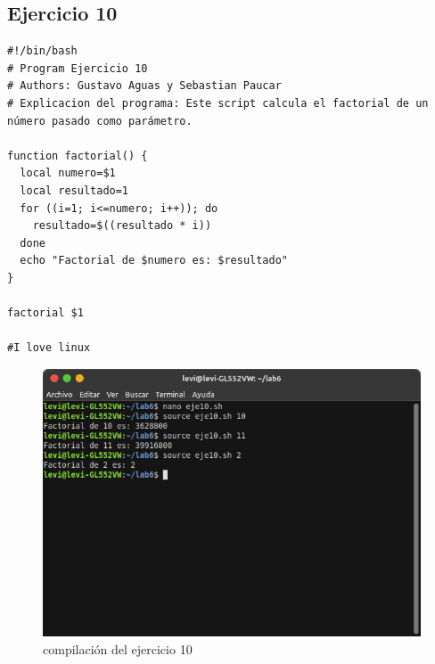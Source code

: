 \documentclass[11pt,twoside]{book}
\begin{document}
\subsection{Ejercicio 10}

\begin{lstlisting}
#!/bin/bash
# Program Ejercicio 10
# Authors: Gustavo Aguas y Sebastian Paucar
# Explicacion del programa: Este script calcula el factorial de un número pasado como parámetro.

function factorial() {
  local numero=$1
  local resultado=1
  for ((i=1; i<=numero; i++)); do
    resultado=$((resultado * i))
  done
  echo "Factorial de $numero es: $resultado"
}

factorial $1

#I love linux
\end{lstlisting}
\begin{figure}[h]
    \centering
    \includegraphics[width=0.8\linewidth]{img_tarea6/eje10con.png}
    \caption{ compilación del ejercicio 10}
\end{figure}

\newpage
\end{document}
